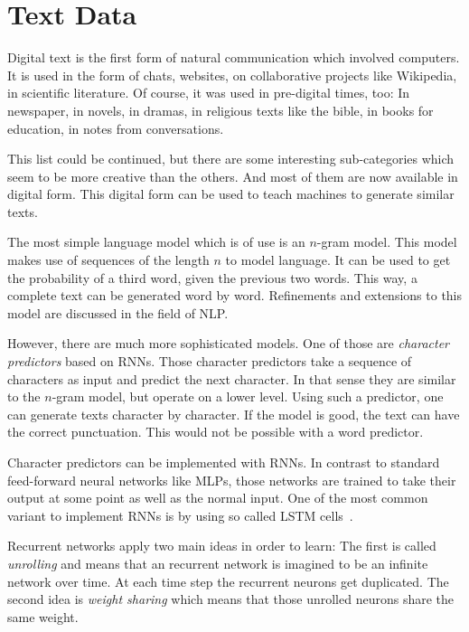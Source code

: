 
\section{Text Data}%
\label{sec:text-generation}%

Digital text is the first form of natural communication which involved
computers. It is used in the form of chats, websites, on collaborative projects
like Wikipedia, in scientific literature. Of course, it was used in pre-digital
times, too: In newspaper, in novels, in dramas, in religious texts like the
bible, in books for education, in notes from conversations.

This list could be continued, but there are some interesting sub-categories
which seem to be more creative than the others. And most of them are now
available in digital form. This digital form can be used to teach machines
to generate similar texts.

The most simple language model which is of use is an $n$-gram model. This model
makes use of sequences of the length $n$ to model language. It can be used to
get the probability of a third word, given the previous two words. This way, a
complete text can be generated word by word. Refinements and extensions to this
model are discussed in the field of \gls{NLP}.

However, there are much more sophisticated models. One of those are
\textit{character predictors} based on \glspl{RNN}. Those character predictors
take a sequence of characters as input and predict the next character. In that
sense they are similar to the $n$-gram model, but operate on a lower level.
Using such a predictor, one can generate texts character by character. If the
model is good, the text can have the correct punctuation. This would not be
possible with a word predictor.

Character predictors can be implemented with \glspl{RNN}. In contrast to
standard feed-forward neural networks like \glspl{MLP}, those networks are
trained to take their output at some point as well as the normal input. One of
the most common variant to implement \glspl{RNN} is by using so called
\gls{LSTM} cells~\cite{hochreiter1997long}.

Recurrent networks apply two main ideas in order to learn: The first is called
\textit{unrolling} and means that an recurrent network is imagined to be
an infinite network over time. At each time step the recurrent neurons get
duplicated. The second idea is \textit{weight sharing} which means that those
unrolled neurons share the same weight.



